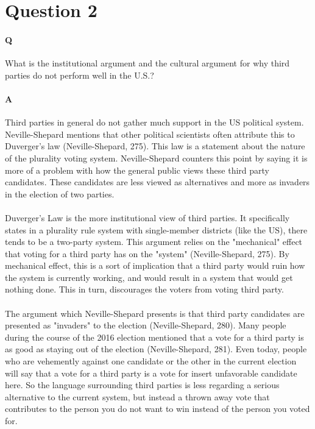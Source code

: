 \documentclass[12pt]{article}
\begin{document}
\section*{Question 2}
\paragraph{Q}
What is the institutional argument and the cultural argument for why third
parties do not perform well in the U.S.? 
\paragraph{A}
Third parties in general do not gather much support in the US
political system. Neville-Shepard mentions that other political
scientists often attribute this to Duverger's law (Neville-Shepard,
275). This law is a statement about the nature of the plurality voting
system. Neville-Shepard counters this point by saying it is more of a
problem with how the general public views these third party
candidates. These candidates are less viewed as alternatives and more
as invaders in the election of two parties.
\paragraph{}
Duverger's Law is the more institutional view of third parties. It
specifically states in a plurality rule system with single-member
districts (like the US), there tends to be a two-party system. This
argument relies on the "mechanical" effect that voting for a third
party has on the "system" (Neville-Shepard, 275). By mechanical
effect, this is a sort of implication that a third party would ruin
how the system is currently working, and would result in a system that
would get nothing done. This in turn, discourages the voters from
voting third party.
\paragraph{}
The argument which Neville-Shepard presents is that third party
candidates are presented as "invaders" to the election
(Neville-Shepard, 280). Many people during the course of the 2016
election mentioned that a vote for a third party is as good as staying
out of the election (Neville-Shepard, 281). Even today, people who are
vehemently against one candidate or the other in the current election
will say that a vote for a third party is a vote for insert
unfavorable candidate here. So the language surrounding third parties
is less regarding a serious alternative to the current system, but
instead a thrown away vote that contributes to the person you do not
want to win instead of the person you voted for. 
\end{document}
